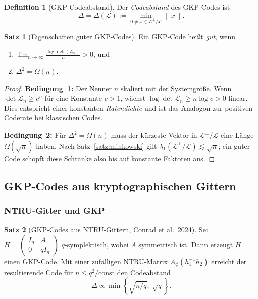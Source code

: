 ﻿\documentclass[a4paper,12pt]{article}
\theoremstyle{definition}
\newtheorem{definition}{Definition}
\newtheorem{satz}{Satz}
\newcommand{\Lat}{\mathcal{L}}
\newcommand{\norm}[1]{\left\|#1\right\|}
\begin{document}
\begin{definition}[GKP-Codeabstand]
Der \emph{Codeabstand} des GKP-Codes ist
\[
    \Delta = \Delta(\Lat) := \min_{0 \neq x \in \Lat^\perp / \Lat} \norm{x}.
\]
\end{definition}

\begin{satz}[Eigenschaften guter GKP-Codes]
\label{satz:good_gkp}
Ein GKP-Code heißt \emph{gut}, wenn
\begin{enumerate}
    \item $\lim_{n \to \infty} \frac{\log \det(\mathcal{L}_n)}{n} > 0$, und
    \item $\Delta^2 = \Omega(n)$.
\end{enumerate}
\end{satz}

\begin{proof}
\textbf{Bedingung~1:} Der Nenner $n$ skaliert mit der Systemgröße.
Wenn $\det \Lat_n \geq c^n$ für eine Konstante $c > 1$, wächst
$\log \det \Lat_n \geq n \log c > 0$ linear.
Dies entspricht einer konstanten \emph{Ratendichte} und ist das Analogon zur positiven
Coderate bei klassischen Codes.

\textbf{Bedingung~2:}
Für $\Delta^2 = \Omega(n)$ muss der kürzeste Vektor in $\Lat^\perp / \Lat$
eine Länge $\Omega(\sqrt{n})$ haben.
Nach Satz~\ref{satz:minkowski} gilt $\lambda_1(\Lat^\perp / \Lat) \lesssim \sqrt{n}$;
ein guter Code schöpft diese Schranke also bis auf konstante Faktoren aus.
\end{proof}

\subsection{GKP-Codes aus kryptographischen Gittern}

\subsubsection{NTRU-Gitter und GKP}

\begin{satz}[GKP-Codes aus NTRU-Gittern, Conrad et al.~2024]
\label{satz:ntru_gkp}
Sei $H = \begin{pmatrix} I_n & A \\ 0 & qI_n \end{pmatrix}$ $q$-symplektisch, wobei $A$
symmetrisch ist. Dann erzeugt $H$ einen GKP-Code.
Mit einer zufälligen NTRU-Matrix $A_\phi(h_1^{-1}h_2)$ erreicht der resultierende Code
für $n \leq q^2/\mathrm{const}$ den Codeabstand
\[
    \Delta \propto \min\!\left\{ \sqrt{n/q},\; \sqrt{q} \right\}.
\]
\end{satz}
\end{document}
